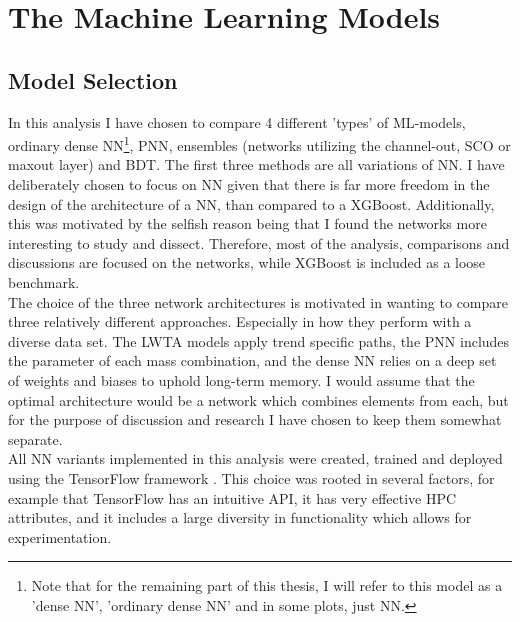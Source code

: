 \section{The Machine Learning Models}
\subsection{Model Selection}
In this analysis I have chosen to compare 4 different 'types' of \ac{ML}-models, ordinary dense \acf{NN}\footnote{Note 
that for the remaining part of this thesis, I will refer to this model as a 'dense \ac{NN}', 'ordinary dense \ac{NN}' 
and in some plots, just \ac{NN}.}, \acf{PNN}, ensembles (networks utilizing the channel-out, \ac{SCO} or maxout layer) 
and \acf{BDT}. The first three methods are all variations of \ac{NN}. I have deliberately 
chosen to focus on \ac{NN} given that there is far more freedom in the design of the architecture
of a \ac{NN}, than compared to a XGBoost. Additionally, this was motivated by the selfish reason
being that I found the networks more interesting to study and dissect. Therefore, most of the 
analysis, comparisons and discussions are focused on the networks, while XGBoost is included 
as a loose benchmark. 
\\
The choice of the three network architectures is motivated in wanting to compare three relatively different approaches.
Especially in how they perform with a diverse data set. The \ac{LWTA} models apply trend specific paths, the \ac{PNN} includes 
the parameter of each mass combination, and the dense \ac{NN} relies on a deep set of weights and biases to uphold long-term memory.
I would assume that the optimal architecture would be a network which combines elements from each, but for the purpose of discussion
and research I have chosen to keep them somewhat separate. 
\\
All \ac{NN} variants implemented in this analysis were created, trained and deployed using the TensorFlow framework \cite{tensorflow}.
This choice was rooted in several factors, for example that TensorFlow has an intuitive \ac{API}, it has very effective
\ac{HPC} attributes, and it includes a large diversity in functionality which allows for experimentation.

